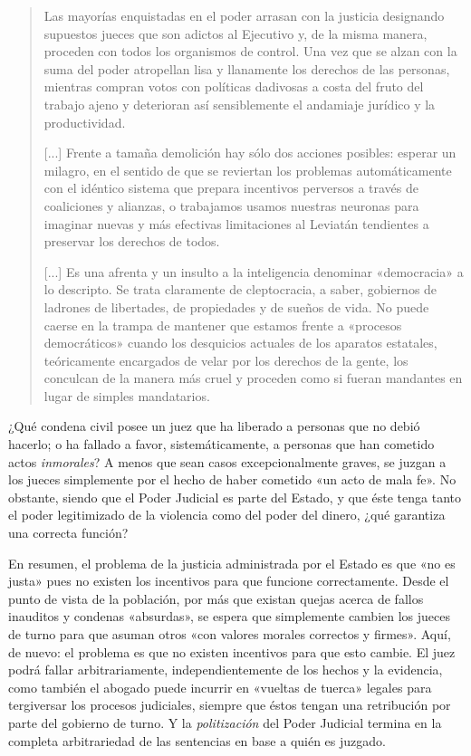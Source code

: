 \documentclass[12pt,a4paper,twoside]{book}
\begin{document}
\begin{quotation}
Las mayorías enquistadas en el poder arrasan con la justicia designando supuestos jueces que son adictos al Ejecutivo y, de la misma manera, proceden con todos los organismos de control. Una vez que se alzan con la suma del poder atropellan lisa y llanamente los derechos de las personas, mientras compran votos con políticas dadivosas a costa del fruto del trabajo ajeno y deterioran así sensiblemente el andamiaje jurídico y la productividad.

[...] Frente a tamaña demolición hay sólo dos acciones posibles: esperar un milagro, en el sentido de que se reviertan los problemas automáticamente con el idéntico sistema que prepara incentivos perversos a través de coaliciones y alianzas, o trabajamos usamos nuestras neuronas para imaginar nuevas y más efectivas limitaciones al Leviatán tendientes a preservar los derechos de todos.

[...] Es una afrenta y un insulto a la inteligencia denominar «democracia» a lo descripto. Se trata claramente de cleptocracia, a saber, gobiernos de ladrones de libertades, de propiedades y de sueños de vida. No puede caerse en la trampa de mantener que estamos frente a «procesos democráticos» cuando los desquicios actuales de los aparatos estatales, teóricamente encargados de velar por los derechos de la gente, los conculcan de la manera más cruel y proceden como si fueran mandantes en lugar de simples mandatarios. \cite{abl:poder-judicial}
\end{quotation}

¿Qué condena civil posee un juez que ha liberado a personas que no debió hacerlo; o ha fallado a favor, sistemáticamente, a personas que han cometido actos \textit{inmorales}? A menos que sean casos excepcionalmente graves, se juzgan a los jueces simplemente por el hecho de haber cometido «un acto de mala fe». No obstante, siendo que el Poder Judicial es parte del Estado, y que éste tenga tanto el poder legitimizado de la violencia como del poder del dinero, ¿qué garantiza una correcta función? 

En resumen, el problema de la justicia administrada por el Estado es que «no es justa» pues no existen los incentivos para que funcione correctamente. Desde el punto de vista de la población, por más que existan quejas acerca de fallos inauditos y condenas «absurdas», se espera que simplemente cambien los jueces de turno para que asuman otros «con valores morales correctos y firmes». Aquí, de nuevo: el problema es que no existen incentivos para que esto cambie. El juez podrá fallar arbitrariamente, independientemente de los hechos y la evidencia, como también el abogado puede incurrir en «vueltas de tuerca» legales para tergiversar los procesos judiciales, siempre que éstos tengan una retribución por parte del gobierno de turno. Y la \textit{politización} del Poder Judicial termina en la completa arbitrariedad de las sentencias en base a quién es juzgado.
\end{document}
